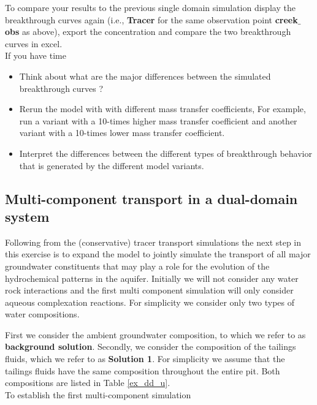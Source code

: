 To compare your results to the previous single domain simulation 
display the breakthrough curves again (i.e., {\color{blue}\textbf{Tracer}}
for the same observation point {\color{blue}\textbf{creek$\_$obs}} as above), 
export the concentration and compare the two breakthrough curves in excel. \\

If you have time
\begin{itemize}
\item Think about what are the major differences between the simulated 
breakthrough curves ?
\item Rerun the model with with different mass transfer coefficients, 
For example, run a variant with a 10-times higher mass transfer coefficient
and another variant with a 10-times lower mass transfer coefficient. 
\item Interpret the differences between the different types
of breakthrough behavior that is generated by the different model variants.
\end{itemize}

\subsection{Multi-component transport in a dual-domain system}

Following from the (conservative) tracer transport simulations
the next step in this exercise is to expand the model to jointly simulate 
the transport of all major groundwater constituents that may play a role
for the evolution of the hydrochemical patterns in the aquifer.  
Initially we will not consider any water rock interactions and the 
first multi component simulation will only consider aqueous 
complexation reactions. For simplicity we consider only two types 
of water compositions. 

First we consider the ambient groundwater composition, to which we refer 
to as {\color{blue}\textbf{background solution}}. 
Secondly, we consider the composition 
of the tailings fluids, which we refer 
to as {\color{blue}\textbf{Solution 1}}.
For simplicity we assume that the tailings fluids have the same composition
throughout the entire pit. 
Both compositions are listed in Table \ref{ex_dd_u}.
\\
To establish the first multi-component simulation

